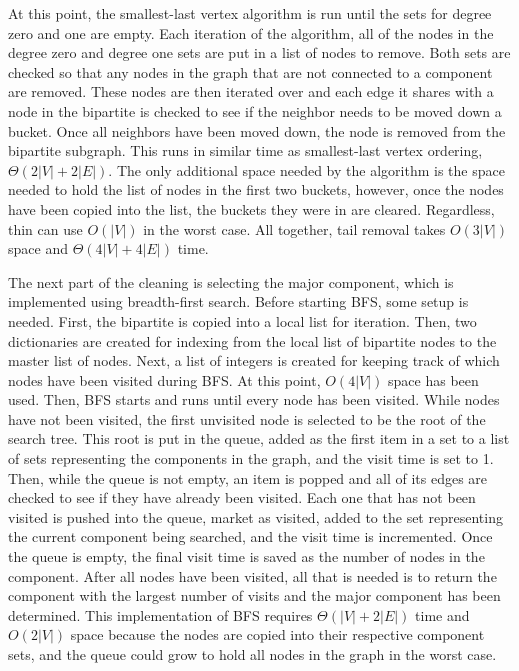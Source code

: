 \documentclass{article}
\begin{document}
        At this point, the smallest-last vertex algorithm is run until the sets for degree zero and one are empty. Each iteration of the algorithm, all of the nodes in the degree zero and degree one sets are put in a list of nodes to remove. Both sets are checked so that any nodes in the graph that are not connected to a component are removed. These nodes are then iterated over and each edge it shares with a node in the bipartite is checked to see if the neighbor needs to be moved down a bucket. Once all neighbors have been moved down, the node is removed from the bipartite subgraph. This runs in similar time as smallest-last vertex ordering, $\Theta(2|V| + 2|E|)$. The only additional space needed by the algorithm is the space needed to hold the list of nodes in the first two buckets, however, once the nodes have been copied into the list, the buckets they were in are cleared. Regardless, thin can use $O(|V|)$ in the worst case. All together, tail removal takes $O(3|V|)$ space and $\Theta(4|V| + 4|E|)$ time.
        \par
        The next part of the cleaning is selecting the major component, which is implemented using breadth-first search. Before starting BFS, some setup is needed. First, the bipartite is copied into a local list for iteration. Then, two dictionaries are created for indexing from the local list of bipartite nodes to the master list of nodes. Next, a list of integers is created for keeping track of which nodes have been visited during BFS. At this point, $O(4|V|)$ space has been used. Then, BFS starts and runs until every node has been visited. While nodes have not been visited, the first unvisited node is selected to be the root of the search tree. This root is put in the queue, added as the first item in a set to a list of sets representing the components in the graph, and the visit time is set to 1. Then, while the queue is not empty, an item is popped and all of its edges are checked to see if they have already been visited. Each one that has not been visited is pushed into the queue, market as visited, added to the set representing the current component being searched, and the visit time is incremented. Once the queue is empty, the final visit time is saved as the number of nodes in the component. After all nodes have been visited, all that is needed is to return the component with the largest number of visits and the major component has been determined. This implementation of BFS requires $\Theta(|V| + 2|E|)$ time and $O(2|V|)$ space because the nodes are copied into their respective component sets, and the queue could grow to hold all nodes in the graph in the worst case.
\end{document}

